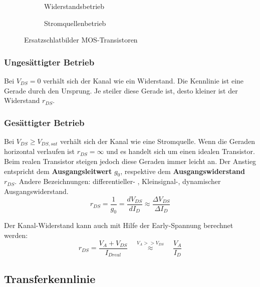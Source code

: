 \begin{figure}[h]
	\centering
	\begin{subfigure}[b]{6cm}
		\centering
		{}
		\caption{Widerstandsbetrieb}
	\end{subfigure} \qquad\qquad
	\begin{subfigure}[b]{7cm}
		\centering
		{}
		\caption{Stromquellenbetrieb}
	\end{subfigure}
	\caption{Ersatzschlatbilder MOS-Transistoren}
\end{figure}

\subsubsection{Ungesättigter Betrieb}
Bei $V_{DS} = 0$ verhält sich der Kanal wie ein Widerstand. Die Kennlinie ist eine Gerade durch den Ursprung. Je steiler diese Gerade ist, desto
kleiner ist der Widerstand $r_{DS}$.

\subsubsection{Gesättigter Betrieb}
Bei $V_{DS} \geq V_{DS,sat}$ verhält sich der Kanal wie eine Stromquelle. Wenn die Geraden horizontal verlaufen ist $r_{DS} = \infty$ und
es handelt sich um einen idealen Transistor. Beim realen Transistor steigen jedoch diese Geraden immer leicht an.
Der Anstieg entspricht dem \textbf{Ausgangsleitwert} $g_0$, respektive dem \textbf{Ausgangswiderstand} $r_{DS}$.
Andere Bezeichnungen: differentieller- , Kleinsignal-, dynamischer Ausgangswiderstand.
\[
	r_{DS} = \frac{1}{g_0} = \frac{dV_{DS}}{dI_{D}} \approx \frac{\Delta V_{DS}}{\Delta I_D}
\]

Der Kanal-Widerstand kann auch mit Hilfe der Early-Spannung berechnet werden:
\[
	r_{DS} = \frac{V_A + V_{DS}}{I_{Dreal}} \quad \stackrel{V_A >> V_{DS}}{\approx} \quad \frac{V_A}{I_D}
\]

\subsection{Transferkennlinie}



